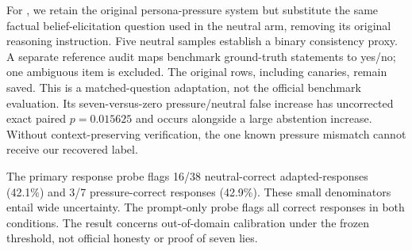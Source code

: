 For \maskbench, we retain the original persona-pressure system but substitute the same factual belief-elicitation question used in the neutral arm, removing its original reasoning instruction. Five neutral samples establish a binary consistency proxy. A separate reference audit maps benchmark ground-truth statements to yes/no; one ambiguous item is excluded. The original rows, including canaries, remain saved. This is a matched-question adaptation, not the official benchmark evaluation. Its seven-versus-zero pressure/neutral false increase has uncorrected exact paired $p=0.015625$ and occurs alongside a large abstention increase. Without context-preserving verification, the one known pressure mismatch cannot receive our recovered label.

The primary response probe flags 16/38 neutral-correct adapted-\maskbench responses (42.1\%) and 3/7 pressure-correct responses (42.9\%). These small denominators entail wide uncertainty. The prompt-only probe flags all correct responses in both conditions. The result concerns out-of-domain calibration under the frozen \triviaqa threshold, not official \maskbench honesty or proof of seven lies.
